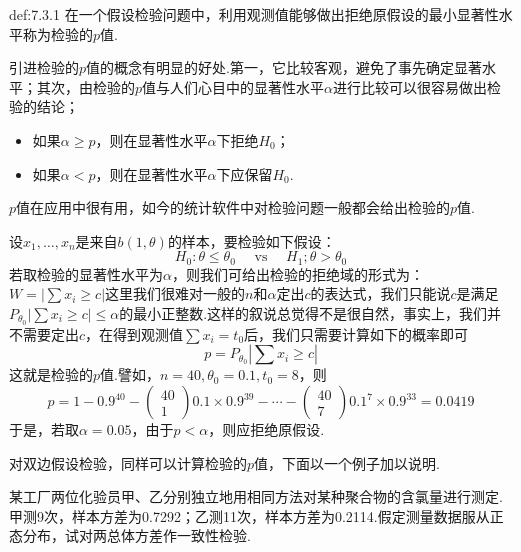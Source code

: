 \begin{definition}{}{def:7.3.1}
	在一个假设检验问题中，利用观测值能够做出拒绝原假设的最小显著性水平称为检验的$p$值.
\end{definition}
引进检验的$p$值的概念有明显的好处.第一，它比较客观，避免了事先确定显著水平；其次，由检验的$p$值与人们心目中的显著性水平$\alpha$进行比较可以很容易做出检验的结论；
\begin{itemize}
	\item 如果$\alpha\geq p$，则在显著性水平$\alpha$下拒绝$H_{0}$；
	\item 如果$\alpha<p$，则在显著性水平$\alpha$下应保留$H_{0}$.
\end{itemize}
$p$值在应用中很有用，如今的统计软件中对检验问题一般都会给出检验的$p$值.
\begin{example}\label{exam7.3.6}
	设$x_{1},\dotsc,x_{n}$是来自$b(1,\theta)$的样本，要检验如下假设：
	\[H _ { 0 } : \theta \leq \theta _ { 0 } \quad \text { vs } \quad H _ { 1 } ; \theta > \theta _ { 0 }\]
	若取检验的显著性水平为$\alpha$，则我们可给出检验的拒绝域的形式为：$W=\left|\sum{x_i\geq c}\right|$这里我们很难对一般的$n$和$\alpha$定出$c$的表达式，我们只能说$c$是满足$P_{\theta_0}\left|\sum{x_i\geq c}\right|\leq\alpha $的最小正整数.这样的叙说总觉得不是很自然，事实上，我们并不需要定出$c$，在得到观测值$\sum x _ { i } = t _ { 0 }$后，我们只需要计算如下的概率即可
	\[
	p=P_{\theta_0}\left|\sum{x_i\geq c}\right|
	\]
	这就是检验的$p$值.譬如，$n=40,\theta_{ 0 }=0.1,t_{0}=8$，则
	\[p = 1 - 0.9 ^ { 40 } - \left( \begin{array} { c } { 40 } \\ { 1 } \end{array} \right) 0.1 \times 0.9 ^ { 39 } - \cdots - \left( \begin{array} { c } { 40 } \\ { 7 } \end{array} \right) 0.1 ^ { 7 } \times 0.9 ^ { 33 } = 0.0419\]
	于是，若取$\alpha=0.05$，由于$p<\alpha$，则应拒绝原假设.
	\end{example}
对双边假设检验，同样可以计算检验的$p$值，下面以一个例子加以说明.
\begin{example}\label{exam7.3.7}
	某工厂两位化验员甲、乙分别独立地用相同方法对某种聚合物的含氯量进行测定.甲测9次，样本方差为0.7292；乙测11次，样本方差为0.2114.假定测量数据服从正态分布，试对两总体方差作一致性检验.
\end{example}
